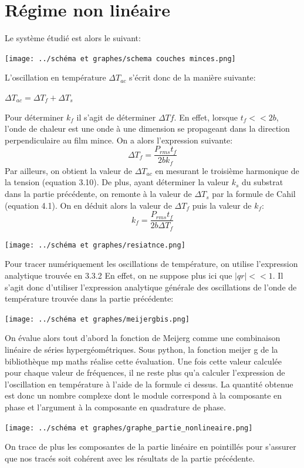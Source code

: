\documentclass[10pt,a4paper]{report}
\begin{document}
\section{Régime non linéaire}
Le système étudié est alors le suivant:
\begin{center}
\texttt{[image: ../schéma et graphes/schema couches minces.png]}
\end{center}
L'oscillation en température $\Delta T_{ac}$ s'écrit donc de la manière suivante:
\begin{center}
$\Delta T_{ac}=\Delta T_{f}+\Delta T_{s}$
\end{center}
Pour déterminer $k_{f}$ il s'agit de déterminer $\Delta T{f}$. En effet, lorsque $t_{f}<<2b$, l'onde de chaleur est une onde à une dimension se propageant dans la direction perpendiculaire au film mince. On a alors l'expression suivante:
\begin{equation}
\Delta T_{f}=\frac{P_{rms}t_{f}}{2bk_{f}}
\end{equation}
Par ailleurs, on obtient la valeur de $\Delta T_{ac}$ en mesurant le troisième harmonique de la tension (equation 3.10).
De plus, ayant déterminer la valeur $k_{s}$ du substrat dans la partie précédente, on remonte à la valeur de $\Delta T_{s}$ par la formule de Cahil (equation 4.1). On en déduit alors la valeur de $\Delta T_{f}$ puis la valeur de $k_{f}$:
\begin{equation}
k_{f}=\frac{P_{rms}t_{f}}{2b\Delta T_{f}}
\end{equation}
\begin{center}
\texttt{[image: ../schéma et graphes/resiatnce.png]}
\end{center}
Pour tracer numériquement les oscillations de température, on utilise l'expression analytique trouvée en 3.3.2
En effet, on ne suppose plus ici que $\lvert qr\rvert<<1$. Il s'agit donc d'utiliser l'expression analytique générale des oscillations de l'onde de température trouvée dans la partie précédente:
\begin{center}
\texttt{[image: ../schéma et graphes/meijergbis.png]}
\end{center}
On évalue alors tout d'abord la fonction de Meijerg comme une combinaison linéaire de séries hypergéométriques. Sous python, la fonction meijer g de la bibliothèque mp maths réalise cette évaluation. Une fois cette valeur calculée pour chaque valeur de fréquences, il ne reste plus qu'a calculer l'expression de l'oscillation en température à l'aide de la formule ci dessus. La quantité obtenue est donc un nombre complexe dont le module correspond à la composante en phase et l'argument à la composante en quadrature de phase.
\begin{center}
\texttt{[image: ../schéma et graphes/graphe\_partie\_nonlineaire.png]}
\end{center}
On trace de plus les composantes de la partie linéaire en pointillés pour s'assurer que nos tracés soit cohérent avec les résultats de la partie précédente.
\end{document}
